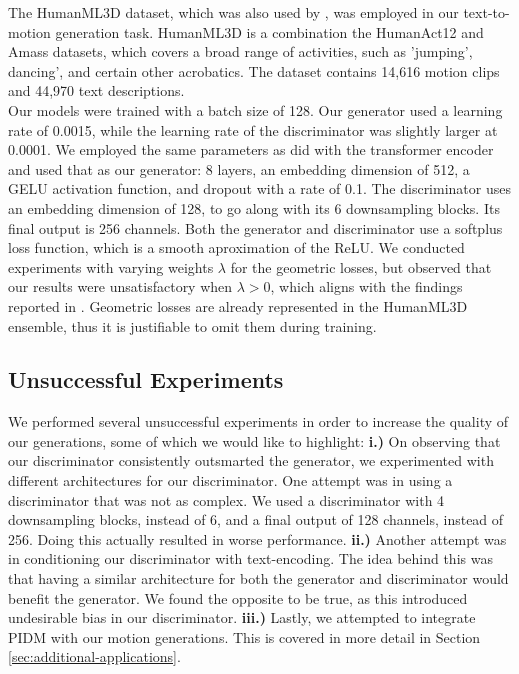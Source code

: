 \documentclass[10pt,twocolumn,letterpaper]{article}
\begin{document}
The HumanML3D dataset, which was also used by \cite{Tevet23}, was employed in our text-to-motion generation task. HumanML3D \cite{Guo_2022_CVPR}
is a combination the HumanAct12 \cite{guo2020action2motion} and Amass \cite{Amass} datasets, which covers a broad range of activities, such as 'jumping', 
dancing', and certain other acrobatics. The dataset contains 14,616 motion clips and 44,970 text descriptions.
\\

Our models were trained with a batch size of 128. Our generator used a learning rate of 0.0015, while the learning rate of the discriminator was slightly 
larger at 0.0001. We employed the same parameters as \cite{Tevet23} did with the transformer encoder and used that as our generator: 8 layers, an embedding 
dimension of 512, a GELU activation function, and dropout with a rate of 0.1. The discriminator uses an embedding dimension of 128, to go along with its 6 
downsampling blocks. Its final output is 256 channels. Both the generator and discriminator use a softplus loss function, which is a smooth aproximation 
of the ReLU. We conducted experiments with varying weights $\lambda$ for the geometric losses, but observed that our results were unsatisfactory when 
$\lambda > 0$, which aligns with the findings reported in \cite{Tevet23}. Geometric losses are already represented in the HumanML3D ensemble, thus it is
justifiable to omit them during training.

\subsection{Unsuccessful Experiments}

We performed several unsuccessful experiments in order to increase the quality of our generations, some of which we would like to highlight: \textbf{i.)} On observing 
that our discriminator consistently outsmarted the generator, we experimented with different architectures for our discriminator. One attempt was in using a discriminator that was
not as complex. We used a discriminator with 4 downsampling blocks, instead of 6, and a final output of 128 channels, instead of 256.  Doing this actually 
resulted in worse performance. \textbf{ii.)} Another attempt was in conditioning our discriminator with text-encoding. The idea behind this was that having a similar architecture 
for both the generator and discriminator would benefit the generator. We found the opposite to be true, as this introduced undesirable bias in our discriminator. \textbf{iii.)} Lastly,
we attempted to integrate PIDM with our motion generations. This is covered in more detail in Section \ref{sec:additional-applications}.
\end{document}

